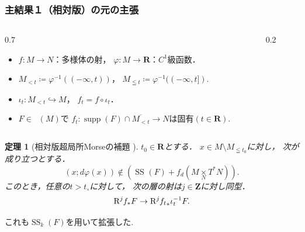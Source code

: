 \documentclass[dvipdfmx,10pt,aspectratio=169,leqno]{beamer}%
\newcommand{\zz}{\mathbf{Z}}
\newcommand{\rr}{\mathbf{R}}
\numberwithin{equation}{subsection}
\newcommand{\supp}{\mathop{\mathrm{supp}}\nolimits}
\newcommand{\Dompb}{\mathop{\mathsf{D}^\mathrm{b}}\nolimits}
\newcommand{\muS}[1][]{\mathop{\mathrm{SS}}\nolimits_{#1}}
\newcommand{\Rder}[1][]{\mathop{\mathrm{R}^{#1}\hspace{-2pt}}\nolimits}
\newcommand{\mdiff}[1][]{{#1}_{d}} %
\newcommand{\pb}[1][]{\mathbin{\mathop{\times}\limits_{#1}}}
\newcommand{\cotb}[1][]{T^{\ast}{#1}}
\theoremstyle{mystyle}
\newtheorem{THM}[AXM]{定理}
\begin{document}
\begin{frame}[fragile]
  \frametitle{主結果１（相対版）の元の主張}
  \begin{columns}
    \begin{column}{0.7\hsize}
      \begin{itemize}
        \item \(f\colon M\to N\)：多様体の射，
        \quad\(\varphi\colon M\to \rr\)：\(C^{1}\)級函数．
        \item \(M_{<t}\coloneqq \varphi^{-1}((-\infty,t))\)，\quad
        \(M_{\leqq t}\coloneqq \varphi^{-1}((-\infty,t])\).
        \item \(\iota_{t}\colon M_{<t}\hookrightarrow M\)，
        \quad\(f_{t}=f\circ \iota_{t}\)．
        \item \(F\in\Dompb(M)\)で
        \(f_{t}\colon \supp(F)\cap \overline{M_{<t}}\to N\)は固有\((t\in\rr).\)
      \end{itemize}
    \end{column}
    \begin{column}{0.2\hsize}
    \end{column}
  \end{columns}\pause
  \begin{THM}[相対版超局所Morseの補題 {\cite{KS90}}]
    \(t_{0}\in\rr\)とする．
    \(x\in M\setminus M_{\leqq t_{0}}\)に対し，
    次が成り立つとする．
    \[
      (x;d\varphi(x))\notin \left(
        \muS[](F)+ \mdiff[f]\left(
          M\pb[N]\cotb[N]
        \right)
      \right).
    \]
    このとき，任意の\(t>t_{\circ}\)に対して，
    次の層の射は\(j\in\zz\)に対し同型．
    \[
      \Rder[j]{f_{\ast}}F
      \to
      \Rder[j]{{f_{t}}_{\ast}}\iota^{-1}_{t}F.
    \]
  \end{THM}\pause
  これも\(\muS[k](F)\)を用いて拡張した.
\end{frame}
\end{document}
